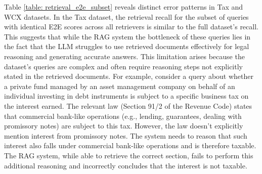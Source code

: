 
Table \ref{table: retrieval_e2e_subset} reveals distinct error patterns in Tax and WCX datasets. In the Tax dataset, the retrieval recall for the subset of queries with identical E2E scores across all retrievers is similar to the full dataset's recall. This suggests that while the RAG system the bottleneck of these queries lies in the fact that the LLM struggles to use retrieved documents effectively for legal reasoning and generating accurate answers. This limitation arises because the dataset's queries are complex and often require reasoning steps not explicitly stated in the retrieved documents. For example, consider a query about whether a private fund managed by an asset management company on behalf of an individual investing in debt instruments is subject to a specific business tax on the interest earned. The relevant law (Section 91/2 of the Revenue Code) states that commercial bank-like operations (e.g., lending, guarantees, dealing with promissory notes) are subject to this tax. However, the law doesn't explicitly mention interest from promissory notes. The system needs to reason that such interest also falls under commercial bank-like operations and is therefore taxable. The RAG system, while able to retrieve the correct section, fails to perform this additional reasoning and incorrectly concludes that the interest is not taxable.

